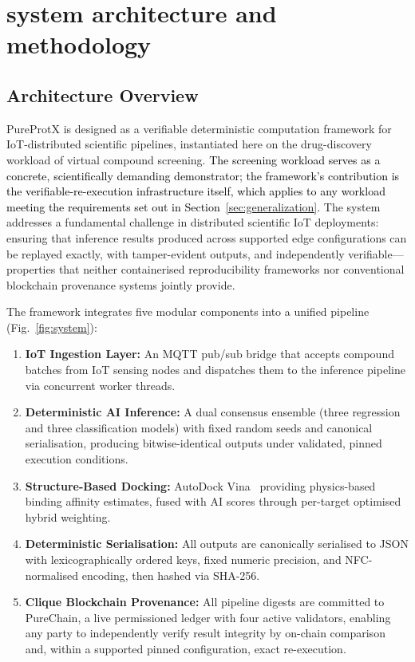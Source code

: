 \documentclass[conference]{IEEEtran}
\newcommand{\rev}[2]{#2}
\begin{document}
\section{\textbf{system architecture and methodology}}
\label{sec:methods}


\subsection{\textbf{Architecture Overview}}
\label{sec:arch}

PureProtX is designed as a verifiable deterministic computation
framework for IoT-distributed scientific pipelines, instantiated here
on the drug-discovery workload of virtual compound screening.
\textcolor{black}{The screening workload serves as a concrete,
scientifically demanding demonstrator; the framework's
contribution is the verifiable-re-execution infrastructure
itself, which applies to any workload meeting the
requirements set out in Section~\ref{sec:generalization}.}
The system addresses a fundamental challenge in distributed scientific
IoT deployments: ensuring that inference results produced across
\rev{R1.1}{supported edge configurations can be replayed exactly, with tamper-evident outputs,}
and independently verifiable---properties that neither containerised
reproducibility frameworks nor conventional blockchain provenance
systems jointly provide.

The framework integrates five modular components into a unified
pipeline (Fig.~\ref{fig:system}):

\begin{enumerate}
    \item \textbf{IoT Ingestion Layer:} An MQTT pub/sub bridge that
    accepts compound batches from IoT sensing nodes and dispatches
    them to the inference pipeline via concurrent worker threads.
    \item \textbf{Deterministic AI Inference:} A dual consensus ensemble (\rev{R2.1}{three regression and three classification models}) with
    fixed random seeds and canonical serialisation, producing
    \rev{R1.1}{bitwise-identical outputs under validated, pinned execution conditions}.
    \item \textbf{Structure-Based Docking:} AutoDock Vina~\cite{eberhardt2021autodock}
    providing physics-based binding affinity estimates, fused with
    AI scores through per-target optimised hybrid weighting.
    \item \textbf{Deterministic Serialisation:} All outputs are
    canonically serialised to JSON with lexicographically ordered
    keys, fixed numeric precision, and NFC-normalised encoding,
    then hashed via SHA-256.
    \item \textbf{\rev{R1.2, R2.4}{Clique Blockchain Provenance:}} All pipeline digests
    are committed to PureChain, a live permissioned ledger with
    four active validators, enabling any party to independently
    \rev{R1.1}{verify result integrity by on-chain comparison and, within a supported pinned configuration, exact re-execution}.
\end{enumerate}
\end{document}
